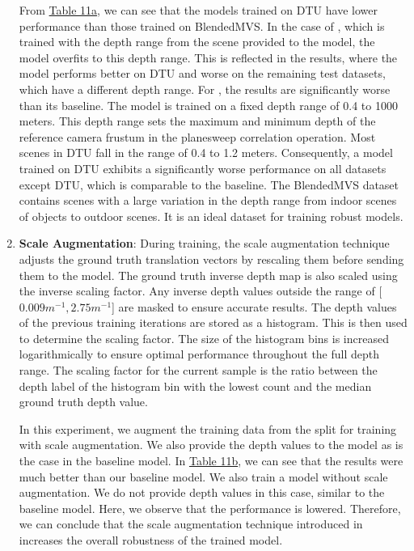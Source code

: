 \begin{enumerate}
From \hyperref[tab:data-prop]{Table 11a}, we can see that the models trained on DTU have lower performance than those trained on BlendedMVS. In the case of {\mvsn}, which is trained with the depth range from the scene provided to the model, the model overfits to this depth range. This is reflected in the results, where the model performs better on DTU and worse on the remaining test datasets, which have a different depth range. For {\rmvd}, the results are significantly worse than its baseline. The {\rmvd} model is trained on a fixed depth range of 0.4 to 1000 meters. This depth range sets the maximum and minimum depth of the reference camera frustum in the planesweep correlation operation. Most scenes in DTU fall in the range of 0.4 to 1.2 meters. Consequently, a {\rmvd} model trained on DTU exhibits a significantly worse performance on all datasets except DTU, which is comparable to the baseline. The BlendedMVS dataset contains scenes with a large variation in the depth range from indoor scenes of objects to outdoor scenes. It is an ideal dataset for training robust {\mvs} models. 
\item \textbf{Scale Augmentation}: 
During training, the scale augmentation technique\cite{schroeppel2022benchmark} adjusts the ground truth translation vectors by rescaling them before sending them to the model. The ground truth inverse depth map is also scaled using the inverse scaling factor. Any inverse depth values outside the range of [$0.009 m^{−1}, 2.75 m^{−1}$] are masked to ensure accurate results. The depth values of the previous training iterations are stored as a histogram. This is then used to determine the scaling factor. The size of the histogram bins is increased logarithmically to ensure optimal performance throughout the full depth range. The scaling factor for the current sample is the ratio between the depth label of the histogram bin with the lowest count and the median ground truth depth value. \par
In this experiment, we augment the training data from the {\bms} split for training {\mvsn} with scale augmentation. We also provide the depth values to the model as is the case in the baseline {\mvsn} model. In \hyperref[tab:data-prop]{Table 11b}, we can see that the results were much better than our baseline model. We also train a {\rmvd} model without scale augmentation. We do not provide depth values in this case, similar to the baseline model. Here, we observe that the performance is lowered. Therefore, we can conclude that the scale augmentation technique introduced in \cite{schroeppel2022benchmark} increases the overall robustness of the trained model. 

\end{enumerate}
